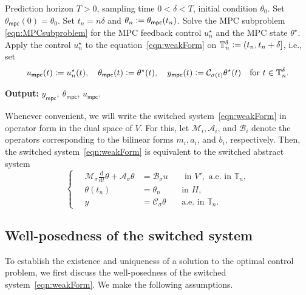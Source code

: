 \documentclass[reqno]{amsart}
\newcommand{\timeInt}{\mathbb{T}}
\newcommand{\state}{\theta}
\newcommand{\inpVar}{u}
\newcommand{\outVar}{y}
\newcommand{\ddt}{\tfrac{\mathrm{d}}{\mathrm{d}t}}
\newcommand{\mOper}{\calM}
\newcommand{\aOper}{\calA}
\newcommand{\bOper}{\calB}
\newcommand{\cOper}{\calC}
\newcommand{\optState}{\state^\star}
\newcommand{\optInpVar}[1]{\inpVar_{#1}^\star}
\newcommand{\optInpVarN}{\optInpVar{n}}
\newcommand{\stateMPC}{\state_{\mathsf{mpc}}}
\newcommand{\inpVarMPC}{\inpVar_{\mathsf{mpc}}}
\newcommand{\outVarMPC}{\outVar_{\mathsf{mpc}}}
\newcommand{\switch}{\sigma}
\newcommand{\calA}{\mathcal{A}}
\newcommand{\calB}{\mathcal{B}}
\newcommand{\calC}{\mathcal{C}}
\newcommand{\calM}{\mathcal{M}}
\newcommand{\abbr}[1]{\textsf{#1}\xspace}
\newcommand{\FOM}{\abbr{FOM}}
\newcommand{\MPC}{\abbr{MPC}}
\begin{document}
\begin{algorithm}[t]
	\caption{(\FOM-\MPC)}\label{alg:FOM-MPC}
	\begin{algorithmic}[1]
		\Require Prediction horizon $T>0$, sampling time $0<\delta<T$, initial condition $\state_0$.
        \State Set $\stateMPC(0) = \state_0$.
	        \State Set $t_n = n\delta$ and $\state_n \vcentcolon= \stateMPC(t_n)$.
		    \State Solve the \MPC subproblem \eqref{eqn:MPCsubproblem} for the \MPC feedback control $\optInpVarN$ and the \MPC state $\optState$. 
		    \State Apply the control $\optInpVarN$ to the equation~\eqref{eqn:weakForm} on $\timeInt_n^\delta \vcentcolon= (t_n,t_n+\delta]$, i.e., set
            \begin{align*}
            \inpVarMPC(t)\vcentcolon=\optInpVarN{(t)}, \quad\stateMPC (t)\vcentcolon=\optState(t), \quad\outVarMPC (t)\vcentcolon=\cOper_{\switch{(t)}} \optState{(t)}\quad\text{for }t\in \timeInt_n^\delta.
            \end{align*}
		\EndFor 
	\end{algorithmic}
    \begin{flushleft}
        \textbf{Output:} $\outVarMPC,\ \stateMPC$, $\inpVarMPC$.
    \end{flushleft}
\end{algorithm}
%
Whenever convenient, we will write the switched system~\eqref{eqn:weakForm} in operator form in the dual space of $V$. For this, let $\mOper_i,\aOper_i$, and $\bOper_i$ denote the operators corresponding to the bilinear forms $m_i,a_i$, and $b_i$, respectively. Then, the switched system~\eqref{eqn:weakForm} is equivalent to the switched abstract system
\begin{equation}
    \label{eq:OPLSS}
    \left\{\quad
    \begin{aligned}
        \mOper_{\switch}\ddt\state + \aOper_{\switch}\state &= \bOper_{\switch}\inpVar && \text{ in }V', \text{ a.e. in } \timeInt_n,\\
       \state(t_n) &= \state_{n} && \text{in } H,\\
       \outVar &= \cOper_{\switch}\state &&\text{a.e. in }\timeInt_n.
    \end{aligned}\right.
\end{equation}
%
\subsection{Well-posedness of the switched system}
\label{subsec:switchedSystem}
To establish the existence and uniqueness of a solution to the optimal control problem, we first discuss the well-posedness of the switched system~\eqref{eqn:weakForm}. We make the following assumptions.
\end{document}

